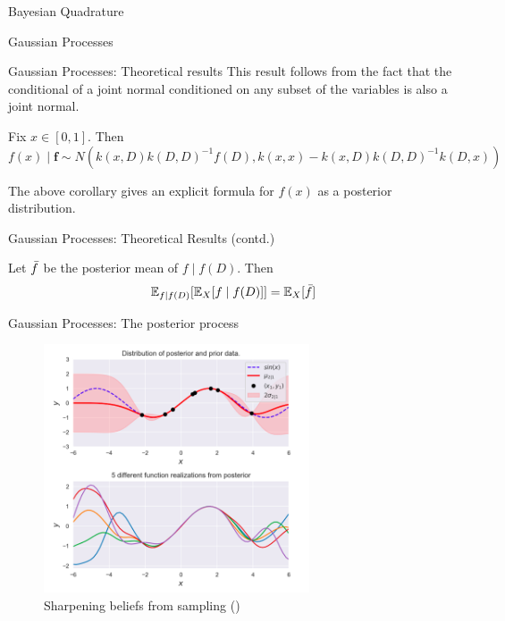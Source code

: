 \documentclass{beamer}
\begin{document}
\begin{section}{Bayesian Quadrature}
\begin{subsection}{Gaussian Processes}
\begin{frame}{Gaussian Processes: Theoretical results}
    This result follows from the fact that the conditional of a joint normal conditioned on any subset of the variables is also a joint normal.
    
    \begin{corollary}
    Fix $x \in [0,1]$. Then 
    $$ f(x) \mid \textbf{f} \sim N(k(x,D)k(D,D)^{-1}f(D), k(x,x) - k(x,D)k(D,D)^{-1}k(D,x))$$
    \end{corollary}
     
     The above corollary gives an explicit formula for $f(x)$ as a posterior distribution. 
\end{frame}

\begin{frame}{Gaussian Processes: Theoretical Results (contd.)}

\begin{theorem}
Let $\Bar{f}$ be the posterior mean of $f \mid f(D)$. Then $$ \mathbb{E}_{f\mid f(D)}[\mathbb{E}_{X}[f\mid f(D)]] = \mathbb{E}_{X}[\Bar{f}]$$ 
\end{theorem}

\end{frame}
\end{subsection}

\begin{frame}{Gaussian Processes: The posterior process}
    \begin{figure}
        \centering
        \includegraphics[width=0.7\textwidth]{GP2.png}
        \caption{Sharpening beliefs from sampling (\cite{PR})}
        \label{fig:GP2}
    \end{figure}
\end{frame}


\end{section}
\end{document}
